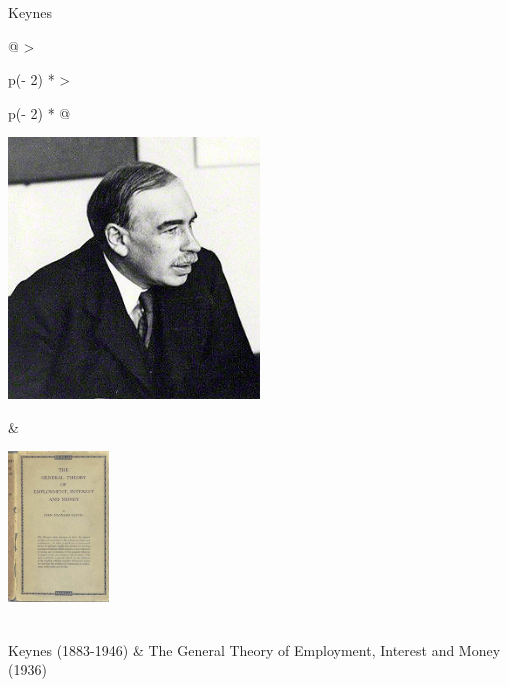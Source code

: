 \begin{frame}{Keynes}
\protect\hypertarget{keynes}{}


\begin{longtable}[]{@{}
  >{\raggedright\arraybackslash}p{(\columnwidth - 2\tabcolsep) * }
  >{\raggedright\arraybackslash}p{(\columnwidth - 2\tabcolsep) * }@{}}
\toprule\noalign{}
\begin{minipage}[b]{\linewidth}\raggedright
\includegraphics[width=0.5\textwidth,height=\textheight]{assets/keynes.jpg}
\end{minipage} & \begin{minipage}[b]{\linewidth}\raggedright
\includegraphics[width=0.2\textwidth,height=\textheight]{assets/general_theory.jpg}
\end{minipage} \\
\midrule\noalign{}
\endhead
\bottomrule\noalign{}
\endlastfoot
Keynes (1883-1946) & The General Theory of Employment, Interest and
Money (1936) \\
\end{longtable}
\end{frame}

